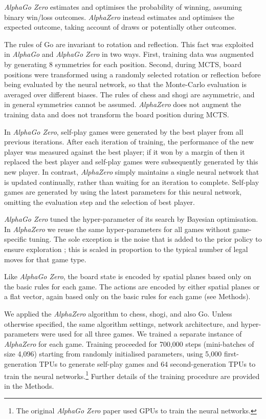 \documentclass[12pt]{article}
\begin{document}
\emph{AlphaGo Zero} estimates and optimises the probability of winning, assuming binary win/loss outcomes. \emph{AlphaZero} instead estimates and optimises the expected outcome, taking account of draws or potentially other outcomes. 

The rules of Go are invariant to rotation and reflection. This fact was exploited in \emph{AlphaGo} and \emph{AlphaGo Zero} in two ways. First, training data was augmented by generating 8 symmetries for each position. Second, during MCTS, board positions were transformed using a randomly selected rotation or reflection before being evaluated by the neural network, so that the Monte-Carlo evaluation is averaged over different biases. The rules of chess and shogi are asymmetric, and in general symmetries cannot be assumed. \emph{AlphaZero} does not augment the training data and does not transform the board position during MCTS.  

In \emph{AlphaGo Zero}, self-play games were generated by the best player from all previous iterations. After each iteration of training, the performance of the new player was measured against the best player; if it won by a margin of  then it replaced the best player and self-play games were subsequently generated by this new player. In contrast, \emph{AlphaZero} simply maintains a single neural network that is updated continually, rather than waiting for an iteration to complete. Self-play games are generated by using the latest parameters for this neural network, omitting the evaluation step and the selection of best player. 

\emph{AlphaGo Zero} tuned the hyper-parameter of its search by Bayesian optimisation. In \emph{AlphaZero} we reuse the same hyper-parameters for all games without game-specific tuning. The sole exception is the noise that is added to the prior policy to ensure exploration \cite{Silver17AG0}; this is scaled in proportion to the typical number of legal moves for that game type.

Like \emph{AlphaGo Zero}, the board state is encoded by spatial planes based only on the basic rules for each game. The actions are encoded by either spatial planes or a flat vector, again based only on the basic rules for each game (see Methods). 



We applied the \emph{AlphaZero} algorithm to chess, shogi, and also Go. Unless otherwise specified, the same algorithm settings, network architecture, and hyper-parameters were used for all three games. We trained a separate instance of \emph{AlphaZero} for each game. Training proceeded for 700,000 steps (mini-batches of size 4,096) starting from randomly initialised parameters, using 5,000 first-generation TPUs \cite{jouppi:tpu} to  generate self-play games and 64 second-generation TPUs to train the neural networks.\footnote{The original \emph{AlphaGo Zero} paper used GPUs to train the neural networks.} Further details of the training procedure are provided in the Methods. 
\end{document}

